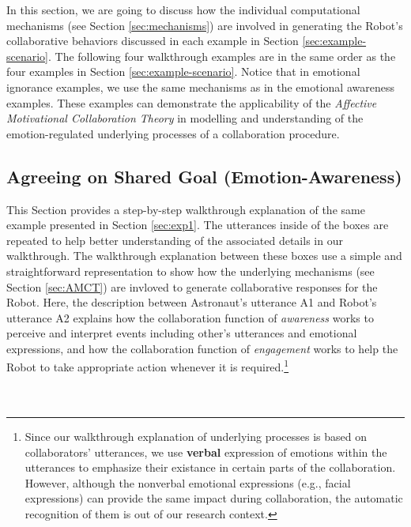 In this section, we are going to discuss how the individual computational
mechanisms (see Section \ref{sec:mechanisms}) are involved in generating the
Robot's collaborative behaviors discussed in each example in Section
\ref{sec:example-scenario}. The following four walkthrough examples are in the
same order as the four examples in Section \ref{sec:example-scenario}. Notice
that in emotional ignorance examples, we use the same mechanisms as in the
emotional awareness examples. These examples can demonstrate the
applicability of the \textit{Affective Motivational Collaboration Theory} in
modelling and understanding of the emotion-regulated underlying processes of a
collaboration procedure.

\subsection{Agreeing on Shared Goal (Emotion-Awareness)}
\label{sec:wt-exp1}

This Section provides a step-by-step walkthrough explanation of the same
example presented in Section \ref{sec:exp1}. The utterances inside of the boxes
are repeated to help better understanding of the associated details in our
walkthrough. The walkthrough explanation between these boxes use a simple and
straightforward representation to show how the underlying mechanisms (see
Section \ref{sec:AMCT}) are invloved to generate collaborative responses for the
Robot. Here, the description between Astronaut's utterance A1 and Robot's
utterance A2 explains how the collaboration function of \textit{awareness} works
to perceive and interpret events including other's utterances and emotional
expressions, and how the collaboration function of \textit{engagement} works
to help the Robot to take appropriate action whenever it is
required.\footnote{Since our walkthrough explanation of underlying processes is
based on collaborators' utterances, we use \textbf{verbal} expression of
emotions within the utterances to emphasize their existance in certain parts of
the collaboration. However, although the nonverbal emotional expressions (e.g.,
facial expressions) can provide the same impact during collaboration, the
automatic recognition of them is out of our research context.}\\

\noindent{}\\ \\

